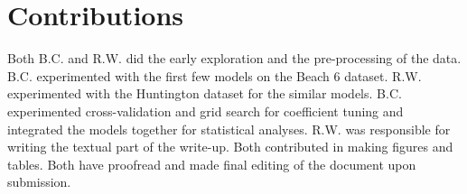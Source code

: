 
\section{Contributions}
\label{sec:contrib}
Both B.C. and R.W. did the early exploration and the pre-processing of the data. B.C. experimented with the first few models on the Beach 6 dataset. R.W. experimented with the Huntington dataset for the similar models. B.C. experimented cross-validation and grid search for coefficient tuning and integrated the models together for statistical analyses. R.W. was responsible for writing the textual part of the write-up. Both contributed in making figures and tables. Both have proofread and made final editing of the document upon submission. 

